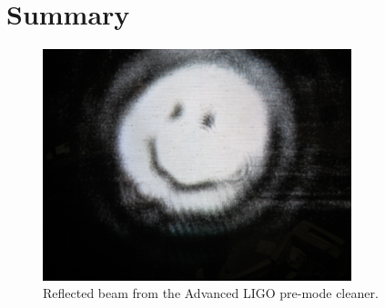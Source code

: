 \chapter{Summary}

\begin{figure}
\begin{centering}
\includegraphics[width=0.8\textwidth]{figures/PMCRefl_smiley.JPG}
\caption{Reflected beam from the Advanced LIGO pre-mode cleaner.}
\label{fig:smiley}
\end{centering}
\end{figure}


\the\columnwidth